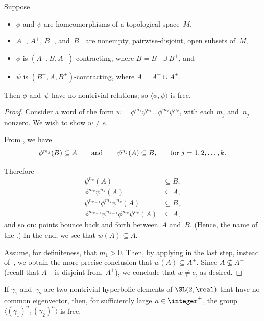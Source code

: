 \begin{lem} \label{PingPong}
 Suppose 
 \begin{itemize}
 \item $\phi$ and $\psi$ are homeomorphisms of a
topological space~$M$,
 \item $A^-$, $A^+$, $B^-$, and~$B^+$ are nonempty,
pairwise-disjoint, open subsets of~$M$,
 \item $\phi$ is $(A^-,B,A^+)$-contracting, where $B = B^-
\cup B^+$, and
 \item $\psi$ is $(B^-,A,B^+)$-contracting, where $A = A^-
\cup A^+$.
 \end{itemize}
 Then $\phi$ and~$\psi$ have no nontrivial relations; so
$\langle \phi, \psi \rangle$ is free.
 \end{lem}

\begin{proof}
 Consider a word of the form $w = \phi^{m_1}
\psi^{n_1} \ldots \phi^{m_k} \psi^{n_k}$, with each $m_j$
and~$n_j$ nonzero. We wish to show $w \neq e$.

From , we have
 $$ \mbox{$\phi^{m_j}(B) \subseteq A$\qquad
 and\qquad
 $\psi^{n_j}(A) \subseteq B$,\qquad
 for $j = 1,2,\ldots,k$.} $$

Therefore
 \begin{align*}
 \psi^{n_k}(A) &\subseteq B, \\
 \phi^{m_k} \psi^{n_k}(A) &\subseteq A, \\
 \psi^{n_{k-1}} \phi^{m_k} \psi^{n_k}(A) &\subseteq B, \\
 \phi^{m_{k-1}} \psi^{n_{k-1}} \phi^{m_k} \psi^{n_k}(A)
&\subseteq A, 
 \end{align*}
 and so on: points bounce back and forth between~$A$
and~$B$. (Hence, the name of the .) In the
end, we see that $w(A) \subseteq A$.

 Assume, for definiteness, that $m_1 > 0$. Then, by
applying  in the last step, instead
of~, we obtain the
more precise conclusion that $w(A) \subseteq A^+$. Since $A
\not\subseteq A^+$ (recall that $A^-$~is disjoint
from~$A^+$), we conclude that $w \neq e$, as desired.
 \end{proof}

\begin{cor} \label{hyperSL2Rfree}
 If $\gamma_1$ and~$\gamma_2$ are two nontrivial hyperbolic
elements of $\SL(2,\real)$ that have no common
eigenvector, then, for sufficiently large $n \in
\integer^+$, the group $\langle (\gamma_1)^n, (\gamma_2)^n
\rangle$ is free.
 \end{cor}

